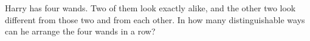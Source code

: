 Harry has four wands. Two of them look exactly alike, and the other two look different from those two and from each other. In how many distinguishable ways can he arrange the four wands in a row?

